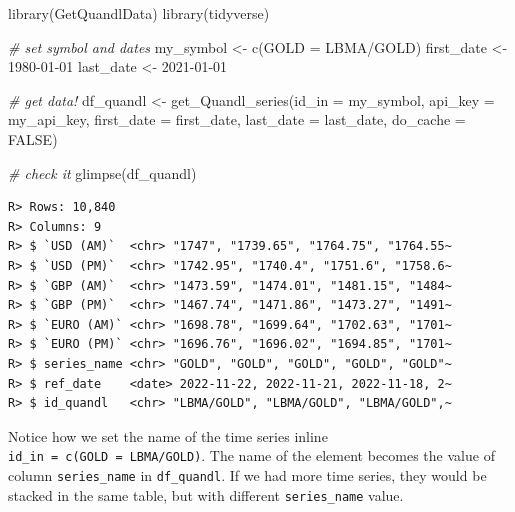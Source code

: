 \documentclass[
  12pt,
]{book}
\newenvironment{Shaded}{\begin{snugshade}}{\end{snugshade}}
\newcommand{\AttributeTok}[1]{\textcolor[rgb]{0.61,0.61,0.61}{#1}}
\newcommand{\CommentTok}[1]{\textcolor[rgb]{0.37,0.37,0.37}{\textit{#1}}}
\newcommand{\ConstantTok}[1]{\textcolor[rgb]{0,0,0}{#1}}
\newcommand{\FunctionTok}[1]{\textcolor[rgb]{0,0,0}{#1}}
\newcommand{\NormalTok}[1]{#1}
\newcommand{\OtherTok}[1]{\textcolor[rgb]{0.37,0.37,0.37}{#1}}
\newcommand{\StringTok}[1]{\textcolor[rgb]{0.5,0.5,0.5}{#1}}
\begin{document}
\begin{Shaded}
\begin{Highlighting}[]
\FunctionTok{library}\NormalTok{(GetQuandlData)}
\FunctionTok{library}\NormalTok{(tidyverse)}

\CommentTok{\# set symbol and dates}
\NormalTok{my\_symbol }\OtherTok{\textless{}{-}} \FunctionTok{c}\NormalTok{(}\StringTok{\textquotesingle{}GOLD\textquotesingle{}} \OtherTok{=} \StringTok{\textquotesingle{}LBMA/GOLD\textquotesingle{}}\NormalTok{)}
\NormalTok{first\_date }\OtherTok{\textless{}{-}} \StringTok{\textquotesingle{}1980{-}01{-}01\textquotesingle{}}
\NormalTok{last\_date }\OtherTok{\textless{}{-}} \StringTok{\textquotesingle{}2021{-}01{-}01\textquotesingle{}}

\CommentTok{\# get data!}
\NormalTok{df\_quandl }\OtherTok{\textless{}{-}} \FunctionTok{get\_Quandl\_series}\NormalTok{(}\AttributeTok{id\_in =}\NormalTok{ my\_symbol,}
                               \AttributeTok{api\_key =}\NormalTok{ my\_api\_key, }
                               \AttributeTok{first\_date =}\NormalTok{ first\_date,}
                               \AttributeTok{last\_date =}\NormalTok{ last\_date, }
                               \AttributeTok{do\_cache =} \ConstantTok{FALSE}\NormalTok{)}

\CommentTok{\# check it}
\FunctionTok{glimpse}\NormalTok{(df\_quandl)}
\end{Highlighting}
\end{Shaded}

\begin{verbatim}
R> Rows: 10,840
R> Columns: 9
R> $ `USD (AM)`  <chr> "1747", "1739.65", "1764.75", "1764.55~
R> $ `USD (PM)`  <chr> "1742.95", "1740.4", "1751.6", "1758.6~
R> $ `GBP (AM)`  <chr> "1473.59", "1474.01", "1481.15", "1484~
R> $ `GBP (PM)`  <chr> "1467.74", "1471.86", "1473.27", "1491~
R> $ `EURO (AM)` <chr> "1698.78", "1699.64", "1702.63", "1701~
R> $ `EURO (PM)` <chr> "1696.76", "1696.02", "1694.85", "1701~
R> $ series_name <chr> "GOLD", "GOLD", "GOLD", "GOLD", "GOLD"~
R> $ ref_date    <date> 2022-11-22, 2022-11-21, 2022-11-18, 2~
R> $ id_quandl   <chr> "LBMA/GOLD", "LBMA/GOLD", "LBMA/GOLD",~
\end{verbatim}

Notice how we set the name of the time series inline \texttt{id\_in\ =\ c(\textquotesingle{}GOLD\textquotesingle{}\ =\ \textquotesingle{}LBMA/GOLD\textquotesingle{})}. The name of the element becomes the value of column \texttt{series\_name} in \texttt{df\_quandl}. If we had more time series, they would be stacked in the same table, but with different \texttt{series\_name} value.
\end{document}
